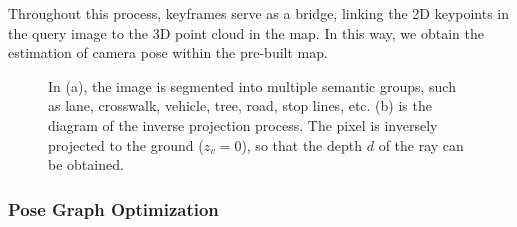 \documentclass[conference]{./support/ieeeconf}
\DeclareMathOperator*{\argmaxA}{arg\,max} %
\DeclareMathOperator*{\argminA}{arg\,min}
\begin{document}

Throughout this process, keyframes serve as a bridge, linking the 2D keypoints in the query image to the 3D point cloud in the map. In this way, we obtain the estimation of camera pose within the pre-built map.

\begin{figure}[h]
	\centering
	\caption{In (a), the image is segmented into multiple semantic groups, such as lane, crosswalk, vehicle, tree, road, stop lines, etc. (b) is the diagram of the inverse projection process. The pixel is inversely projected to the ground ($z_v = 0$), so that the depth $d$ of the ray can be obtained.} 
	\label{fig:segmentation_projection}
\end{figure}

\subsubsection{Pose Graph Optimization}
\end{document}
